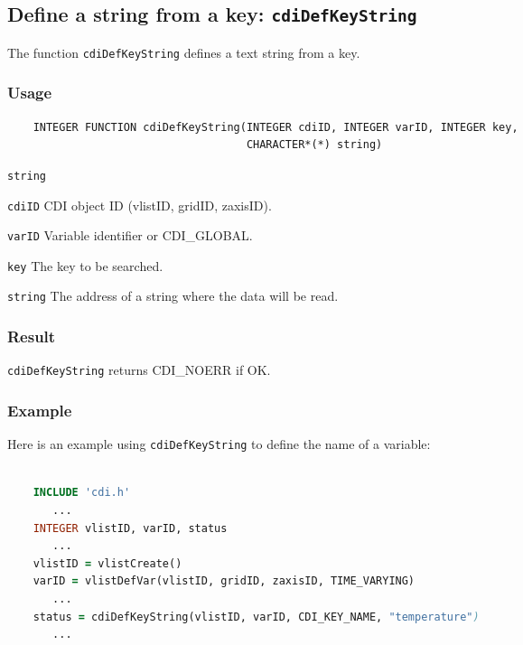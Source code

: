 

\subsection{Define a string from a key: \texttt{cdiDefKeyString}}
\label{cdiDefKeyString}

The function {\texttt{cdiDefKeyString}} defines a text string from a key.

\subsubsection*{Usage}

\begin{verbatim}
    INTEGER FUNCTION cdiDefKeyString(INTEGER cdiID, INTEGER varID, INTEGER key, 
                                     CHARACTER*(*) string)
\end{verbatim}

\hspace*{4mm}\begin{minipage}[]{15cm}
\begin{deflist}{\texttt{string}\ }
\item[\texttt{cdiID}]
CDI object ID (vlistID, gridID, zaxisID).
\item[\texttt{varID}]
Variable identifier or CDI\_GLOBAL.
\item[\texttt{key}]
The key to be searched.
\item[\texttt{string}]
The address of a string where the data will be read.

\end{deflist}
\end{minipage}

\subsubsection*{Result}

{\texttt{cdiDefKeyString}} returns CDI\_NOERR if OK.


\subsubsection*{Example}

Here is an example using {\texttt{cdiDefKeyString}} to define the name of a variable:

\begin{lstlisting}[language=Fortran, backgroundcolor=\color{pyellow}, basicstyle=\small, columns=flexible]

    INCLUDE 'cdi.h'
       ...
    INTEGER vlistID, varID, status
       ...
    vlistID = vlistCreate()
    varID = vlistDefVar(vlistID, gridID, zaxisID, TIME_VARYING)
       ...
    status = cdiDefKeyString(vlistID, varID, CDI_KEY_NAME, "temperature")
       ...
\end{lstlisting}



